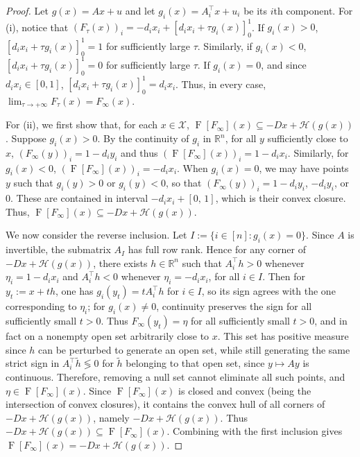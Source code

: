 \documentclass[10pt,a4paper]{amsart}
\newcommand{\R}{\mathbb R}
\newcommand{\X}{\mathcal X}
\newcommand{\mc}{\mathcal}
\begin{document}
\begin{proof}
    Let \(g(x) = Ax + u\) and let \(g_i(x) = A_i^\top x + u_i\) be its \(i\)th component. 
    For (i), notice that \((F_\tau(x))_i = -d_ix_i + [d_ix_i + \tau g_i(x)]_0^1\).
    If \(g_i(x)>0\), \([d_ix_i + \tau g_i(x)]_0^1 = 1\) for sufficiently large \(\tau\).
    Similarly, if \(g_i(x)<0\), \([d_ix_i + \tau g_i(x)]_0^1 = 0\) for sufficiently large \(\tau\).
    If \(g_i(x) = 0\), and since \(d_ix_i \in [0,1]\), \([d_ix_i + \tau g_i(x)]_0^1 = d_ix_i\).
    Thus, in every case, \(\lim_{\tau\to+\infty} F_\tau(x) = F_\infty(x)\).

    For (ii), we first show that, for each \(x\in\X\), \(\operatorname{F}[F_\infty](x) \subseteq -Dx + \mc H(g(x))\).
    Suppose \(g_i(x) > 0\). 
    By the continuity of \(g_i\) in \(\R^n\), for all \(y\) sufficiently close to \(x\), \((F_\infty(y))_i = 1 - d_iy_i\) and thus \((\operatorname{F}[F_\infty](x))_i = 1 - d_ix_i\).
    Similarly, for \(g_i(x)< 0\), \((\operatorname{F}[F_\infty](x))_i = - d_ix_i\).
    When \(g_i(x) = 0\), we may have points \(y\) such that \(g_i(y)>0\) or \(g_i(y)<0\), so that \((F_\infty(y))_i = 1 - d_iy_i\), \(- d_iy_i\), or \(0\). 
    These are contained in interval \(-d_ix_i + [0,\,1]\), which is their convex closure. 
    Thus, \(\operatorname{F}[F_\infty](x) \subseteq -Dx + \mc H(g(x))\).
    
    We now consider the reverse inclusion.
    Let \(I:=\{i\in[n]:g_i(x)=0\}\). 
    Since \(A\) is invertible, the submatrix \(A_I\) has full row rank.
    Hence for any corner of \(-Dx+\mc H(g(x))\), there exists \(h\in\R^n\) such that \(A_i^\top h>0\) whenever \(\eta_i=1-d_i x_i\) and \(A_i^\top h<0\) whenever \(\eta_i=-d_i x_i\), for all \(i\in I\). 
    Then for \(y_t:=x+th\), one has \(g_i(y_t)=tA_i^\top h\) for \(i\in I\), so its sign agrees with the one corresponding to \(\eta_i\); for \(g_i(x)\neq0\), continuity preserves the sign for all sufficiently small \(t>0\). 
    Thus \(F_\infty(y_t)=\eta\) for all sufficiently small \(t>0\), and in fact on a nonempty open set arbitrarily close to \(x\). 
    This set has positive measure since \(h\) can be perturbed to generate an open set, while still generating the same strict sign in \(A_i^\top \tilde h \lessgtr 0\) for  \(\tilde h\) belonging to that open set, since \(y\mapsto Ay\) is continuous.
    Therefore, removing a null set cannot eliminate all such points, and \(\eta\in \operatorname{F}[F_\infty](x)\). 
    Since \(\operatorname{F}[F_\infty](x)\) is closed and convex (being the intersection of convex closures), it contains the convex hull of all corners of \(-Dx+\mc H(g(x))\), namely \(-Dx+\mc H(g(x))\). 
    Thus \(-Dx+\mc H(g(x))\subseteq \operatorname{F}[F_\infty](x)\).
    Combining with the first inclusion gives \(\operatorname{F}[F_\infty](x)= -Dx+\mc H(g(x))\).
\end{proof}
\end{document}
